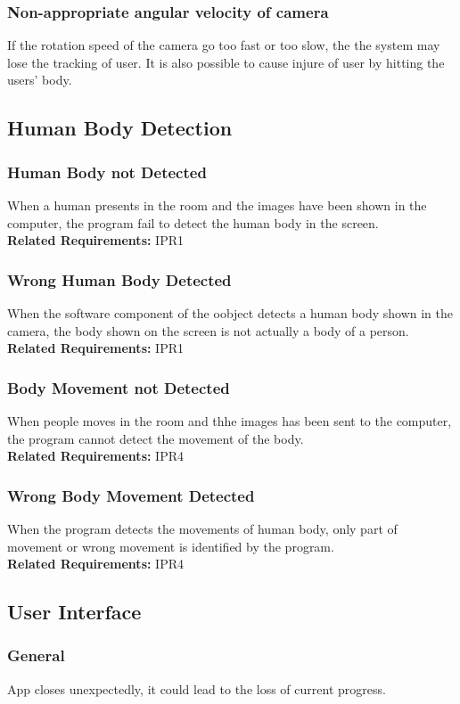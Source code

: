 \documentclass{article}
\begin{document}
\subsubsection{Non-appropriate angular velocity of camera}
If the rotation speed of the camera go too fast or too slow, the the system may lose the tracking of user. It is also possible to cause injure of user by hitting the users' body.
\subsection{Human Body Detection}
\subsubsection{Human Body not Detected}
When a human presents in the room and the images have been shown in the computer, the program fail to detect the human body in the screen. \\
\textbf{Related Requirements: }IPR1
\subsubsection{Wrong Human Body Detected}
When the software component of the oobject detects a human body shown in the camera, the body shown on the screen is not actually a body of a person.\\
\textbf{Related Requirements: }IPR1
\subsubsection{Body Movement not Detected}
When people moves in the room and thhe images has been sent to the computer, the program cannot detect the movement of the body.\\
\textbf{Related Requirements: }IPR4
\subsubsection{Wrong Body Movement Detected}
When the program detects the movements of human body, only part of movement or wrong movement is identified by the program.\\
\textbf{Related Requirements: }IPR4
\subsection{User Interface}
\subsubsection{General}
App closes unexpectedly, it could lead to the loss of current progress.
\end{document}

